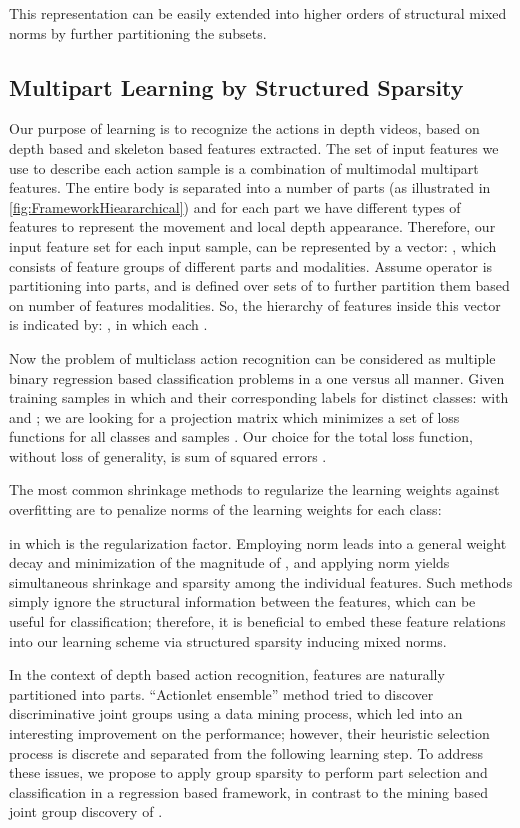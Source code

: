\documentclass[9pt,technote,compsoc]{IEEEtran}
\begin{document}
This representation can be easily extended into higher orders of structural mixed norms by further partitioning the subsets.


\subsection{Multipart Learning by Structured Sparsity}
\label{sec:MP}
Our purpose of learning is to recognize the actions in depth videos, based on depth based and skeleton based features extracted. The set of input features we use to describe each action sample is a combination of multimodal multipart features. The entire body is separated into a number of parts (as illustrated in \figurename{\ref{fig:FrameworkHieararchical}}) and for each part we have different types of features to represent the movement and local depth appearance. Therefore, our input feature set for each input sample, can be represented by a vector: , which consists of feature groups of different parts and modalities. Assume operator  is partitioning  into  parts, and  is defined over sets of  to further partition them based on  number of features modalities. So, the hierarchy of features inside this vector is indicated by: , in which each .

Now the problem of multiclass action recognition can be considered as multiple binary regression based classification problems in a one versus all manner. Given  training samples  in which  and their corresponding labels for  distinct classes:  with  and ; we are looking for a projection matrix  which minimizes a set of loss functions  for all classes  and samples . Our choice for the total loss function, without loss of generality, is sum of squared errors .

The most common shrinkage methods to regularize the learning weights against overfitting are to penalize  norms of the learning weights for each class:

in which  is the regularization factor. Employing  norm  leads into a general weight decay and minimization of the magnitude of , and applying  norm  yields simultaneous shrinkage and sparsity among the individual features. Such methods simply ignore the structural information between the features, which can be useful for classification; therefore, it is beneficial to embed these feature relations into our learning scheme via structured sparsity inducing mixed norms. 

In the context of depth based action recognition, features are naturally partitioned into parts. ``Actionlet ensemble'' method \cite{actionletPAMI} tried to discover discriminative joint groups using a data mining process, which led into an interesting improvement on the performance; however, their heuristic selection process is discrete and separated from the following learning step. To address these issues, we propose to apply group sparsity to perform part selection and classification in a regression based framework, in contrast to the mining based joint group discovery of \cite{actionletPAMI}.
\end{document}
